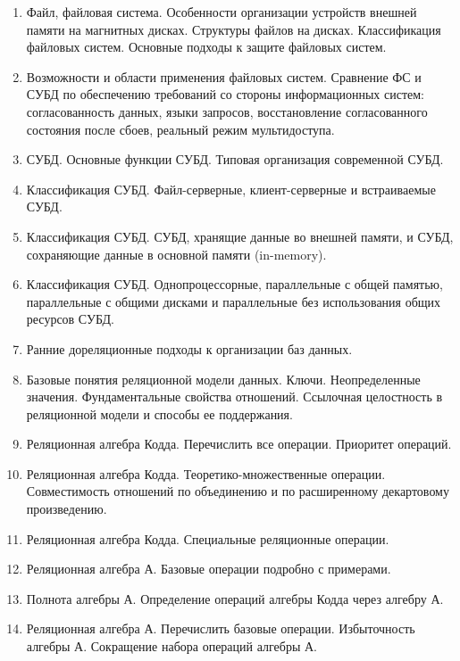 \documentclass[a4paper,12pt]{article}
\begin{document}
\begin{titlepage}
    \centering
    \vspace*{1cm}
        
    \begin{multicols}{3}
        \begin{enumerate}[label=\arabic*.]
            \item Файл, файловая система. Особенности организации устройств внешней памяти на магнитных дисках. Структуры файлов на дисках. Классификация файловых систем. Основные подходы к защите файловых систем.
            \item Возможности и области применения файловых систем. Сравнение ФС и СУБД по обеспечению требований со стороны информационных систем: согласованность данных, языки запросов, восстановление согласованного состояния после сбоев, реальный режим мультидоступа.
            \item СУБД. Основные функции СУБД. Типовая организация современной СУБД.
            \item Классификация СУБД. Файл-серверные, клиент-серверные и встраиваемые СУБД.
            \item Классификация СУБД. СУБД, хранящие данные во внешней памяти, и СУБД, сохраняющие данные в основной памяти (in-memory).
            \item Классификация СУБД. Однопроцессорные, параллельные с общей памятью, параллельные с общими дисками и параллельные без использования общих ресурсов СУБД.
            \item Ранние дореляционные подходы к организации баз данных.
            \item Базовые понятия реляционной модели данных. Ключи. Неопределенные значения. Фундаментальные свойства отношений. Ссылочная целостность в реляционной модели и способы ее поддержания.
            \item Реляционная алгебра Кодда. Перечислить все операции. Приоритет операций.
            \item Реляционная алгебра Кодда. Теоретико-множественные операции. Совместимость отношений по объединению и по расширенному декартовому произведению.
            \item Реляционная алгебра Кодда. Специальные реляционные операции.
            \item Реляционная алгебра А. Базовые операции подробно с примерами.
            \item Полнота алгебры А. Определение операций алгебры Кодда через алгебру А.
            \item Реляционная алгебра А. Перечислить базовые операции. Избыточность алгебры А. Сокращение набора операций алгебры А.

\end{enumerate}
\end{multicols}
\end{titlepage}
\end{document}
